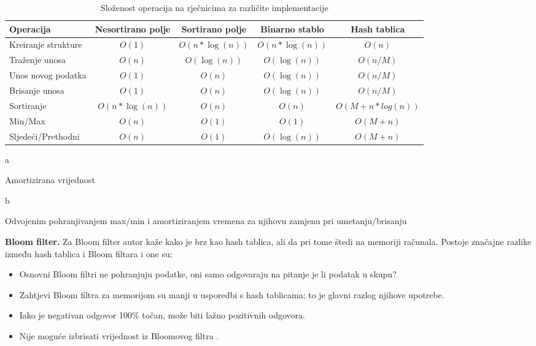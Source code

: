 \documentclass{foi}
\begin{document}
\begin{table}[H]
\centering
\def\arraystretch{1.4}
\caption{Složenost operacija na rječnicima za različite implementacije}
\begin{threeparttable}
\begin{tabular}{l|c|c|c|c}
\hline
\rowcolor[HTML]{416A85}
\color{white} Operacija & \color{white} Nesortirano polje & \color{white} Sortirano polje & \color{white} Binarno stablo & \color{white} Hash tablica\\ 
\hline 
Kreiranje strukture & $O(1)$ & $O(n*\log(n))$ & $O(n*\log(n))$ & $O(n)$ \\ 
\hline 
Traženje unosa & $O(n)$ & $O(\log(n))$ & $O(\log(n))$ & $O(n/M)$ \tnote{a} \\ 
\hline 
Unos novog podatka & $O(1)$ \tnote{a}& $O(n)$ & $O(\log(n))$ & $O(n/M)$ \tnote{a} \\ 
\hline 
Brisanje unosa & $O(1)$ & $O(n)$ & $O(\log(n))$ & $O(n/M)$ \tnote{a} \\ 
\hline 
Sortiranje & $O(n*\log(n))$ & $O(n)$ & $O(n)$ & $O(M+n*log(n))$ \\ 
\hline 
Min/Max & $O(n)$ & $O(1)$ & $O(1)$ \tnote{b} & $O(M+n)$\\ 
\hline
Sljedeći/Prethodni & $O(n)$ & $O(1)$ & $O(\log(n))$ & $O(M+n)$ \\ 
\hline
\end{tabular}
\begin{tablenotes}
     \item[a] \begin{small}Amortizirana vrijednost\end{small}
     \item[b] \begin{small}Odvojenim pohranjivanjem max/min i amortiziranjem vremena za njihovu zamjenu pri umetanju/brisanju\end{small}
   \end{tablenotes}
   \end{threeparttable}
\label{table:tablica1}
\end{table}

\textbf{Bloom filter.}
Za Bloom filter autor kaže kako je brz kao hash tablica, ali da pri tome štedi na memoriji računala. Postoje značajne razlike između hash tablica i Bloom filtara i one su:
\begin{itemize}
    \item Osnovni Bloom filtri ne pohranjuju podatke, oni samo odgovaraju na pitanje je li podatak u skupu?
    \item Zahtjevi Bloom filtra za memorijom su manji u usporedbi s hash tablicama; to je glavni razlog njihove upotrebe.
    \item Iako je negativan odgovor 100\% točan, može biti lažno pozitivnih odgovora.
    \item Nije moguće izbrisati vrijednost iz Bloomovog filtra \cite{la2021advanced}.
\end{itemize}
\end{document}

